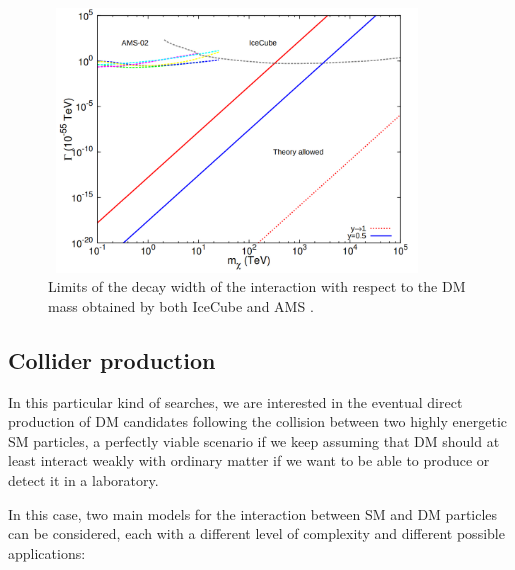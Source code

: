 \documentclass[a4paper, 10pt, openright]{report}
\begin{document}
\begin{figure}[htbp]
\begin{center}
\includegraphics[width=10cm, height=7cm]{figs/AMSData.png}
\caption{Limits of the decay width of the interaction with respect to the \ac{DM} mass obtained by both IceCube and \ac{AMS} \cite{AMSData}.}
\label{fig:AMSData}
\end{center}
\end{figure}

\subsection{Collider production} \label{subsection:ColliderProduction}

In this particular kind of searches, we are interested in the eventual direct production of \ac{DM} candidates following the collision between two highly energetic \ac{SM} particles, a perfectly viable scenario if we keep assuming that \ac{DM} should at least interact weakly with ordinary matter if we want to be able to produce or detect it in a laboratory.

In this case, two main models for the interaction between \ac{SM} and \ac{DM} particles can be considered, each with a different level of complexity and different possible applications:
\end{document}
